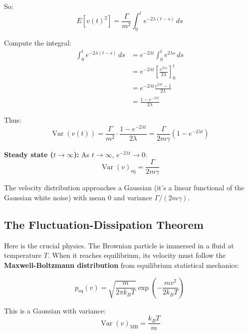 \documentclass[11pt,a4paper]{article}
\begin{document}
	So:
	\begin{equation}
		E[v(t)^2] = \frac{\Gamma}{m^2} \int_0^t e^{-2\lambda(t-s)} \, ds
	\end{equation}
	
	Compute the integral:
	\begin{align}
		\int_0^t e^{-2\lambda(t-s)} \, ds &= e^{-2\lambda t} \int_0^t e^{2\lambda s} \, ds \\
		&= e^{-2\lambda t} \left[ \frac{e^{2\lambda s}}{2\lambda} \right]_0^t \\
		&= e^{-2\lambda t} \frac{e^{2\lambda t} - 1}{2\lambda} \\
		&= \frac{1 - e^{-2\lambda t}}{2\lambda}
	\end{align}
	
	Thus:
	\begin{equation}
		\operatorname{Var}(v(t)) = \frac{\Gamma}{m^2} \cdot \frac{1 - e^{-2\lambda t}}{2\lambda} = \frac{\Gamma}{2m\gamma} \left(1 - e^{-2\lambda t}\right)
	\end{equation}
	
	\textbf{Steady state ($t \to \infty$):}
	As $t \to \infty$, $e^{-2\lambda t} \to 0$:
	\begin{equation}
		\operatorname{Var}(v)_{\text{eq}} = \frac{\Gamma}{2m\gamma}
	\end{equation}
	
	The velocity distribution approaches a Gaussian (it's a linear functional of the Gaussian white noise) with mean 0 and variance $\Gamma / (2m\gamma)$.
	
	\subsection{The Fluctuation-Dissipation Theorem}
	
	Here is the crucial physics. The Brownian particle is immersed in a fluid at temperature $T$. When it reaches equilibrium, its velocity must follow the \textbf{Maxwell-Boltzmann distribution} from equilibrium statistical mechanics:
	
	\begin{equation}
		p_{\text{eq}}(v) = \sqrt{\frac{m}{2\pi k_B T}} \exp\left(-\frac{m v^2}{2 k_B T}\right)
	\end{equation}
	
	This is a Gaussian with variance:
	\begin{equation}
		\operatorname{Var}(v)_{\text{MB}} = \frac{k_B T}{m}
	\end{equation}
	
\end{document}
